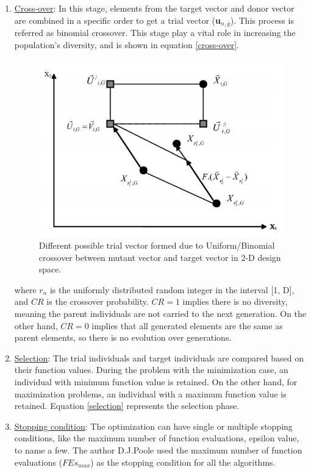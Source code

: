 \begin{enumerate}
\item \underline{Cross-over}: In this stage, elements from the target vector and donor vector are combined in a specific order to get a trial vector (\textbf{u}$_{n,g}$). This process is referred as binomial crossover. This stage play a vital role in increasing the population's diversity, and is shown in equation \ref{cross-over}.

\begin{figure}[!ht]
    \centering
    \includegraphics[scale = 0.5]{figures/crossover.png}
    \caption{Different possible trial vector formed due to Uniform/Binomial crossover between mutant vector and target vector in 2-D design space\cite{storn}.}
    \label{crossover}
\end{figure}


where $r_n$ is the uniformly distributed random integer in the interval [1, D], and $CR$ is the crossover probability. $CR = 1$ implies there is no diversity, meaning the parent individuals are not carried to the next generation. On the other hand, $CR = 0$ implies that all generated elements are the same as parent elements, so there is no evolution over generations.

\item \underline{Selection}: The trial individuals and target individuals are compared based on their function values. During the problem with the minimization case, an individual with minimum function value is retained. On the other hand, for maximization problems, an individual with a maximum function value is retained. Equation \ref{selection} represents the selection phase.


\item \underline{Stopping condition}: The optimization can have single or multiple stopping conditions, like the maximum number of function evaluations, epsilon value, to name a few. The author D.J.Poole used the maximum number of function evaluations ($FEs_{max}$) as the stopping condition for all the algorithms.
\end{enumerate}

